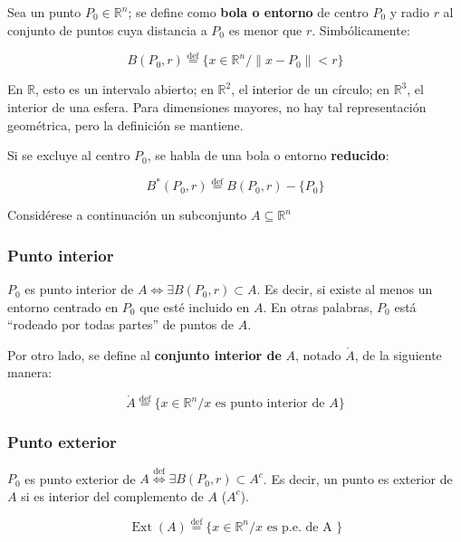 \documentclass{article}
\renewcommand{\Bbb}{\mathbb}
\begin{document}
Sea un punto $P_0 \in \Bbb R^n$; se define como \textbf{bola o entorno} de centro $P_0$ y radio $r$ al conjunto de puntos cuya distancia a $P_0$ es menor que $r$. Simbólicamente:

\begin{equation}
B(P_0, r) \overset{\text{def}}{=} \{ x \in \Bbb R^n / \| x - P_0 \| < r \}
\end{equation}

En $\Bbb R$, esto es un intervalo abierto; en $\Bbb R^2$, el interior de un círculo; en $\Bbb R^3$, el interior de una esfera. Para dimensiones mayores, no hay tal representación geométrica, pero la definición se mantiene.

Si se excluye al centro $P_0$, se habla de una bola o entorno \textbf{reducido}:

\begin{equation}
B^*(P_0, r) \overset{\text{def}}{=} B(P_0, r) - \{ P_0 \}
\end{equation}

Considérese a continuación un subconjunto $A \subseteq \Bbb R^n$

\subsubsection{Punto interior}

$P_0$ es punto interior de $A \Longleftrightarrow \exists B(P_0, r) \subset A$. Es decir, si existe al menos un entorno centrado en $P_0$ que esté incluido en $A$. En otras palabras, $P_0$ está ``rodeado por todas partes'' de puntos de $A$.

Por otro lado, se define al \textbf{conjunto interior de} $A$, notado $\mathring{A}$, de la siguiente manera:

\begin{equation}
\mathring{A} \overset{\text{def}}{=} \{ x \in \Bbb R^n / x \text{ es punto interior de } A \}
\end{equation}

\subsubsection{Punto exterior}

$P_0$ es punto exterior de $A \overset{\text{def}}{ \Longleftrightarrow } \exists B(P_0, r) \subset A^c$. Es decir, un punto es exterior de $A$ si es interior del complemento de $A$ ($A^c$).

\begin{equation}
\mathop{Ext}(A) \overset{\text{def}}{=} \{ x \in \Bbb R^n / x \text{ es p.e. de A } \}
\end{equation}
\end{document}
